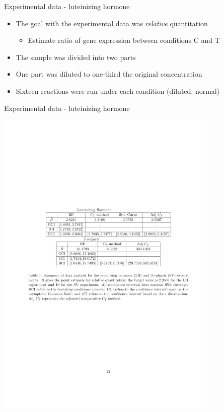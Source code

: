 \documentclass{beamer}
\begin{document}
\begin{frame}{Experimental data - luteinizing hormone} 
\begin{itemize}
  \item The goal with the experimental data was \emph{relative} quantitation
  \begin{itemize}
    \item Estimate ratio of gene expression between conditions C and T
  \end{itemize}
  \item The sample was divided into two parts
  \item One part was diluted to one-third the original concentration
  \item Sixteen reactions were run under each condition (diluted, normal)
\end{itemize}
\end{frame} 


\begin{frame}{Experimental data - luteinizing hormone} 
\begin{center}
  \includegraphics[width=0.8\textwidth]{figures/lh-results}
\end{center}
\end{frame} 
\end{document}
